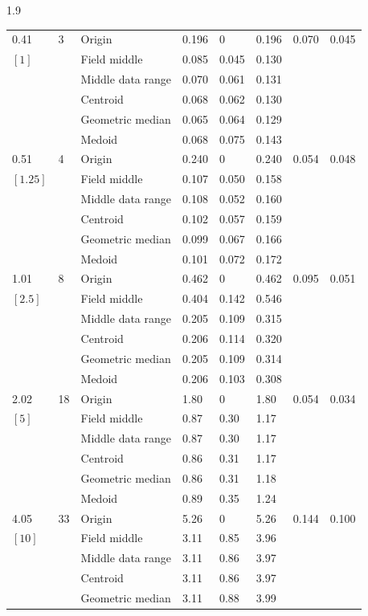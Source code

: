 \documentclass[phd]{ndsu-thesis-2022}
\newcommand\myspacing{1.9}      %
\begin{document}
\begin{spacing}{\myspacing}
{{\begin{ThreePartTable}
\begin{longtable}{lll lll ll}
0.41 & 3 & Origin  & 0.196 & 0 & 0.196 & 0.070 & 0.045 \\
$[1]$ &  & Field middle  & 0.085 & 0.045 & 0.130 \\
 &  & Middle data range  & 0.070 & 0.061 & 0.131 \\
 &  & Centroid & 0.068 & 0.062 & 0.130 \\
 &  & Geometric median & 0.065 & 0.064 & 0.129 \\
 &  & Medoid  & 0.068 & 0.075 & 0.143 \\
\midrule
0.51 & 4 & Origin  & 0.240 & 0 & 0.240 & 0.054 & 0.048 \\
$[1.25]$ &  & Field middle  & 0.107 & 0.050 & 0.158 \\
 &  & Middle data range  & 0.108 & 0.052 & 0.160 \\
 &  & Centroid & 0.102 & 0.057 & 0.159 \\
 &  & Geometric median & 0.099 & 0.067 & 0.166 \\
 &  & Medoid  & 0.101 & 0.072 & 0.172 \\
\midrule
1.01 & 8 & Origin  & 0.462 & 0 & 0.462 & 0.095 & 0.051 \\
$[2.5]$ &  & Field middle  & 0.404 & 0.142 & 0.546 \\
 &  & Middle data range  & 0.205 & 0.109 & 0.315 \\
 &  & Centroid & 0.206 & 0.114 & 0.320 \\
 &  & Geometric median & 0.205 & 0.109 & 0.314 \\
 &  & Medoid  & 0.206 & 0.103 & 0.308 \\
\midrule
2.02 & 18 & Origin  & 1.80 & 0 & 1.80 & 0.054 & 0.034 \\
$[5]$ &  & Field middle  & 0.87 & 0.30 & 1.17 \\
 &  & Middle data range  & 0.87 & 0.30 & 1.17 \\
 &  & Centroid & 0.86 & 0.31 & 1.17 \\
 &  & Geometric median & 0.86 & 0.31 & 1.18 \\
 &  & Medoid  & 0.89 & 0.35 & 1.24 \\
\midrule
4.05 & 33 & Origin  & 5.26 & 0 & 5.26 & 0.144 & 0.100 \\
$[10]$ &  & Field middle  & 3.11 & 0.85 & 3.96 \\
 &  & Middle data range  & 3.11 & 0.86 & 3.97 \\
 &  & Centroid & 3.11 & 0.86 & 3.97 \\
 &  & Geometric median & 3.11 & 0.88 & 3.99 \\

\end{longtable}
\end{ThreePartTable}}}
\end{spacing}
\end{document}
